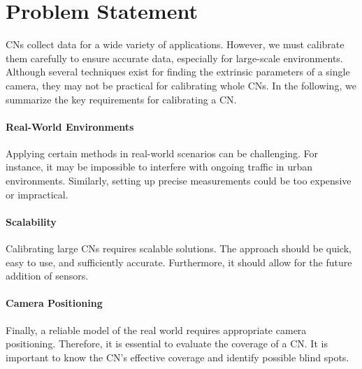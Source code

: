 \section{Problem Statement}
\label{sec:problem}
CNs collect data for a wide variety of applications. However, we 
must calibrate them carefully to ensure accurate data, especially for 
large-scale environments. Although several techniques exist for 
finding the extrinsic parameters of a single camera, they may not be 
practical for calibrating whole CNs. In the following, we summarize 
the key requirements for calibrating a CN.

\paragraph{Real-World Environments} Applying certain methods in real-world 
scenarios can be challenging. For instance, it may be impossible 
to interfere with ongoing traffic in urban environments. Similarly, 
setting up precise measurements could be too expensive or impractical.

\paragraph{Scalability} Calibrating large CNs requires scalable 
solutions. The approach should be quick, easy to use, and sufficiently
accurate. Furthermore, it should allow for the future addition of sensors.

\paragraph{Camera Positioning} Finally, a reliable model of the real 
world requires appropriate camera positioning. Therefore, it is 
essential to evaluate the coverage of a CN. It is important to 
know the CN's effective coverage and identify possible blind spots.
